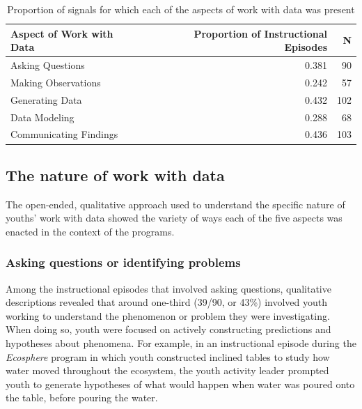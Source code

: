 \documentclass[]{msu-thesis}
\theoremstyle{definition}
\theoremstyle{definition}
\theoremstyle{definition}
\theoremstyle{remark}
\begin{document}
\begin{table}

\caption{\label{tab:unnamed-chunk-9}Proportion of signals for which each of the aspects of work with data was present}
\centering
\begin{tabular}[t]{lrr}
\toprule
Aspect of Work with Data & Proportion of Instructional Episodes & N\\
\midrule
Asking Questions & 0.381 & 90\\
Making Observations & 0.242 & 57\\
Generating Data & 0.432 & 102\\
Data Modeling & 0.288 & 68\\
Communicating Findings & 0.436 & 103\\
\bottomrule
\end{tabular}
\end{table}

\subsection{The nature of work with
data}\label{the-nature-of-work-with-data}

The open-ended, qualitative approach used to understand the specific
nature of youths' work with data showed the variety of ways each of the
five aspects was enacted in the context of the programs.

\subsubsection{Asking questions or identifying
problems}\label{asking-questions-or-identifying-problems}

Among the instructional episodes that involved asking questions,
qualitative descriptions revealed that around one-third (39/90, or 43\%)
involved youth working to understand the phenomenon or problem they were
investigating. When doing so, youth were focused on actively
constructing predictions and hypotheses about phenomena. For example, in
an instructional episode during the \emph{Ecosphere} program in which
youth constructed inclined tables to study how water moved throughout
the ecosystem, the youth activity leader prompted youth to generate
hypotheses of what would happen when water was poured onto the table,
before pouring the water.
\end{document}
